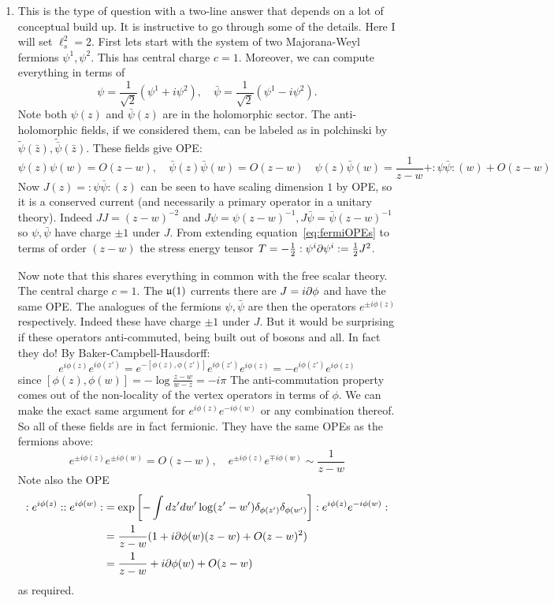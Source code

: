 \documentclass[11pt]{article}
\begin{document}
\begin{enumerate}
	\item This is the type of question with a two-line answer that depends on a lot of conceptual build up. It is instructive to go through some of the details. Here I will set $\ell_s^2 = 2$. First lets start with the system of two Majorana-Weyl fermions $\psi^1, \psi^2$. This has central charge $c=1$. Moreover, we can compute everything in terms of
	\[
		\psi = \frac{1}{\sqrt 2} (\psi^1 + i \psi^2), \quad \bar \psi = \frac{1}{\sqrt 2} (\psi^1 - i \psi^2).
	\]
	Note both $\psi(z)$ and $\bar \psi(z)$ are in the holomorphic sector. The anti-holomorphic fields, if we considered them, can be labeled as in polchinski by $\tilde \psi(\bar z), \tilde{\bar \psi}(\bar z)$. These fields give OPE:
	\begin{equation}\label{eq:fermiOPEs}
		\psi(z) \psi(w) = O(z-w), \quad \bar \psi(z) \bar \psi(w) = O(z-w)  \quad \psi(z) \bar \psi(w) = \frac{1}{z-w} + :\psi \bar \psi:\!(w) + O(z-w)
	\end{equation}
	Now $J(z) = :\psi \bar \psi:\!(z)$ can be seen to have scaling dimension $1$ by OPE, so it is a conserved current (and necessarily a primary operator in a unitary theory). Indeed $J J = (z-w)^{-2}$ and $J\psi = \psi (z-w)^{-1}, J \bar \psi = \bar \psi (z-w)^{-1}$ so $\psi, \bar \psi$ have charge $\pm 1$ under $J$. From extending equation~\eqref{eq:fermiOPEs} to terms of order $(z-w)$ the stress energy tensor $T = - \frac12 :\psi^i \partial \psi^i: = \frac12 J^2$.
	
	Now note that this shares everything in common with the free scalar theory. The central charge $c=1$. The $\frak u(1)$ currents there are $J = i \partial \phi$ and have the same OPE. The analogues of the fermions $\psi, \bar \psi$ are then the operators $e^{\pm i \phi(z)}$ respectively. Indeed these have charge $\pm 1$ under $J$. But it would be surprising if these operators anti-commuted, being built out of bosons and all. In fact they do! By Baker-Campbell-Hausdorff:
	\[
		e^{i \phi(z)} e^{i \phi(z')} = e^{- [\phi(z), \phi(z')]} e^{i \phi(z')} e^{i\phi(z)} = -e^{i \phi(z')} e^{i\phi(z)}
	\]
	since $[\phi(z), \phi(w)] = - \log \frac{z-w}{w-z} = - i \pi$
	The anti-commutation property comes out of the non-locality of the vertex operators in terms of $\phi$. We can make the exact same argument for $e^{i \phi(z)} e^{-i\phi(w)}$ or any combination thereof. So all of these fields are in fact fermionic. They have the same OPEs as the fermions above:
	\[
		e^{\pm i \phi(z)} e^{\pm i \phi(w)} = O(z-w), \quad e^{\pm i \phi(z)} e^{\mp i \phi(w)} \sim \frac{1}{z-w}
	\]
	Note also the OPE 
	\[
	\begin{aligned}
		:e^{i \phi(z)}: :e^{i \phi(w)}: &= \exp\left[- \int dz' dw' \log(z' - w') \delta_{\phi(z')} \delta_{\phi(w')} \right] :e^{i \phi(z)} e^{-i \phi(w)}:\\
		 &= \frac{1}{z-w} (1 + i \partial \phi(w) (z-w) + O(z-w)^2)\\
		 &= \frac{1}{z-w} + i \partial \phi(w) + O(z-w)
	\end{aligned}
	\]
	as required. 
	

\end{enumerate}
\end{document}
